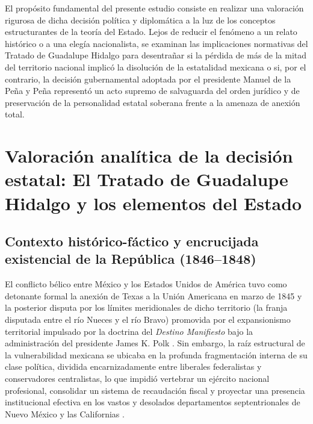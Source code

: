 \documentclass[12pt,spanish,letterpaper,oneside]{article}
\begin{document}
El prop\'osito fundamental del presente estudio consiste en realizar una valoraci\'on rigurosa de dicha decisi\'on pol\'itica y diplom\'atica a la luz de los conceptos estructurantes de la teor\'ia del Estado. Lejos de reducir el fen\'omeno a un relato hist\'orico o a una eleg\'ia nacionalista, se examinan las implicaciones normativas del Tratado de Guadalupe Hidalgo para desentra\~nar si la p\'erdida de m\'as de la mitad del territorio nacional implic\'o la disoluci\'on de la estatalidad mexicana o si, por el contrario, la decisi\'on gubernamental adoptada por el presidente Manuel de la Pe\~na y Pe\~na represent\'o un acto supremo de salvaguarda del orden jur\'idico y de preservaci\'on de la personalidad estatal soberana frente a la amenaza de anexi\'on total.

\section{Valoraci\'on anal\'itica de la decisi\'on estatal: El Tratado de Guadalupe Hidalgo y los elementos del Estado}

\subsection{Contexto hist\'orico-f\'actico y encrucijada existencial de la Rep\'ublica (1846--1848)}

El conflicto b\'elico entre M\'exico y los Estados Unidos de Am\'erica tuvo como detonante formal la anexi\'on de Texas a la Uni\'on Americana en marzo de 1845 y la posterior disputa por los l\'imites meridionales de dicho territorio (la franja disputada entre el r\'io Nueces y el r\'io Bravo) promovida por el expansionismo territorial impulsado por la doctrina del \emph{Destino Manifiesto} bajo la administraci\'on del presidente James K. Polk \citep[pp.~45--68]{vazquez1997,bosch1992}. Sin embargo, la ra\'iz estructural de la vulnerabilidad mexicana se ubicaba en la profunda fragmentaci\'on interna de su clase pol\'itica, dividida encarnizadamente entre liberales federalistas y conservadores centralistas, lo que impidi\'o vertebrar un ej\'ercito nacional profesional, consolidar un sistema de recaudaci\'on fiscal y proyectar una presencia institucional efectiva en los vastos y desolados departamentos septentrionales de Nuevo M\'exico y las Californias \citep[pp.~112--130]{silvaHerzog1993,rabasa2012}.
\end{document}
